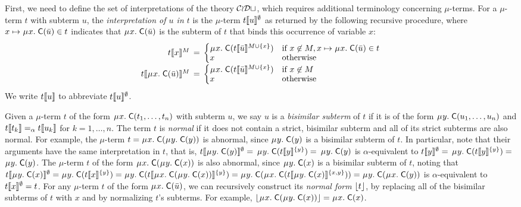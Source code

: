 First, we need to define the set of interpretations of the theory $\mathcal{CoDt}$,
which requires additional terminology concerning $\mu$-terms.
For a $\mu$-term $t$ with subterm $u$,
the \emph{interpretation of\/ $u$ in\/ $t$} is the $\mu$-term $t\llbracket u \rrbracket^\emptyset$ as returned by the following recursive procedure,
where $x \mapsto \MU x.\; \const{C}( \vec u ) \in t$ indicates that $\MU x.\; \const{C}( \vec u )$ is the subterm of $t$ that binds this occurrence of variable $x$:
\[\begin{array}{r@{}c@{}l}
t\interp{x}^M & {} \,=\, {} &
\textstyle\begin{cases}
    \MU x.\; \const{C}( t\interp{ \vec u}^{M \mathrel\cup \{ x \}}) & \text{if }x \not\in M, x \mapsto \MU x.\; \const{C}( \vec u ) \in t  \\[-\jot]
    x & \text{otherwise}
\end{cases} \\
t\interp{\MU x.\; \const{C}( \vec u )}^M & = &
\textstyle\begin{cases}
    \MU x.\; \const{C}( t\interp{ \vec u }^{M \mathrel\cup \{ x \}} ) & \text{if }x \not\in M \\[-\jot]
    x & \text{otherwise}
\end{cases}
\end{array}\]
We write $t\llbracket u \rrbracket$ to abbreviate $t\llbracket u \rrbracket^\emptyset$.

Given a $\mu$-term $t$ of the form $\MU x.\; \const{C}( t_1, \ldots, t_n )$ with subterm $u$,
we say $u$ is a \emph{bisimilar subterm} of $t$ if it is of the form
$\MU y.\; \const{C}( u_1, \ldots, u_n )$ and $t\llbracket  t_k  \rrbracket \mathrel{=_\alpha} t\llbracket  u_k  \rrbracket$ for $k = 1,\ldots, n$.
The term $t$ is \emph{normal} if it does not contain a strict, bisimilar subterm
and all of its strict subterms are also normal.
For example, the $\mu$-term $t = \MU x.\; \const{C}( \MU y.\; \const{C}( y ) )$ is abnormal,
since $\MU y.\; \const{C}( y )$ is a bisimilar subterm of $t$.
In particular, note that their arguments have the same interpretation in $t$,
that is,
$t\interp{\MU y.\; \const{C}( y )}^\emptyset =$
$\MU y.\; \const{C}( t\interp{y}^{\{y\}} ) =$
$\MU y.\; \const{C}( y )$
is $\alpha$-equivalent to
$t\llbracket y \rrbracket^\emptyset =$
$\MU y.\; \const{C}( t\interp{y}^{\{y\}} ) =$
$\MU y.\; \const{C}( y )$.
The $\mu$-term $t$ of the form $\MU x.\; \const{C}( \MU y.\; \const{C}( x ) )$ is also abnormal,
since $\MU y.\; \const{C}( x )$ is a bisimilar subterm of $t$,
noting that
$t\interp{\MU y.\; \const{C}( x )}^\emptyset =
\MU y.\; \const{C}( t\interp{x}^{\{y\}} ) =
\MU y.\; \const{C}( t\interp{\MU x.\; \const{C}( \MU y.\; \const{C}( x ) ) }^{\{y\}} ) =
\MU y.\; \const{C}( \MU x.\; \const{C}( t\interp{\MU y.\; \const{C}( x )}^{\{x,y\}} ) ) =
\MU y.\allowbreak\; \const{C}( \MU x.\; \const{C}( y ) )$
is $\alpha$-equivalent to $t\llbracket x \rrbracket^\emptyset = t$.
For any $\mu$-term $t$ of the form $\MU x.\; \const C( \vec u )$, we can
recursively construct its \emph{normal form} $\lfloor t\rfloor$,
by replacing all of the bisimilar subterms of $t$ with $x$
and by normalizing $t$'s subterms.
For example, $\nf{\MU x.\; \const{C}( \MU y.\; \const{C}( x ) )} = \MU x.\; \const{C}( x )$.

